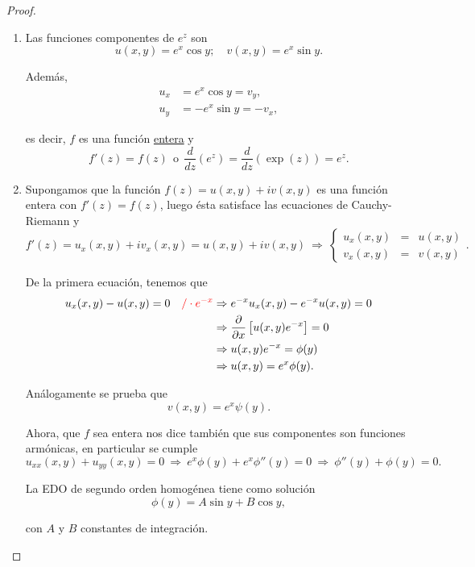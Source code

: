 \begin{proof}
\ 

\begin{enumerate}
    \item Las funciones componentes de $e^z$ son
$$u(x,y) = e^x \cos y; \quad v(x,y) = e^x \sin y.$$

Además, 
\begin{align*}
u_x &= e^x \cos y = v_y, \\
u_y &= -e^x \sin y = -v_x,
\end{align*}

es decir, $f$ es una función \underline{entera} y 
\begin{equation*}
f'(z) = f(z) ~~\mbox{o}~~ \frac{d}{dz}(e^z) = \frac{d}{dz}(\exp(z)) = e^z.
\end{equation*}

\item Supongamos que la función $f(z) = u(x,y) + i v(x,y)$ es una función entera con $f'(z) = f(z)$, luego ésta satisface las ecuaciones de Cauchy-Riemann y 
$$f'(z) = u_x(x,y) + i v_x(x,y) = u(x,y) + iv(x,y) ~\Rightarrow~ \left\{ \begin{array}{ccc}
u_x(x,y) &=& u(x,y) \\
v_x(x,y) &=& v(x,y) 
\end{array} \right. .$$

De la primera ecuación, tenemos que
\begin{align*}
u_x (x,y) - u(x,y) = 0 \quad \color{red}{/\cdot e^{-x}} &\Rightarrow e^{-x} u_x (x,y) - e^{-x} u(x,y) = 0 \\
&\Rightarrow \frac{\partial}{\partial x} \left[ u(x,y)e^{-x} \right] = 0 \\
&\Rightarrow  u(x,y)e^{-x} = \phi(y) \\
&\Rightarrow  u(x,y) = e^{x} \phi(y).
\end{align*}

Análogamente se prueba que 
$$v(x,y) = e^x \psi(y).$$

Ahora, que $f$ sea entera nos dice también que sus componentes son funciones armónicas, en particular se cumple 
\begin{equation*}
u_{xx}(x,y) + u_{yy}(x,y) = 0 ~\Rightarrow~ e^x \phi(y) + e^x \phi''(y) = 0 ~\Rightarrow ~\phi''(y) + \phi(y) = 0.
\end{equation*} 

La EDO de segundo orden homogénea tiene como solución
$$\phi(y) = A \sin y + B \cos y,$$

con $A$ y $B$ constantes de integración.


\end{enumerate}
\end{proof}
